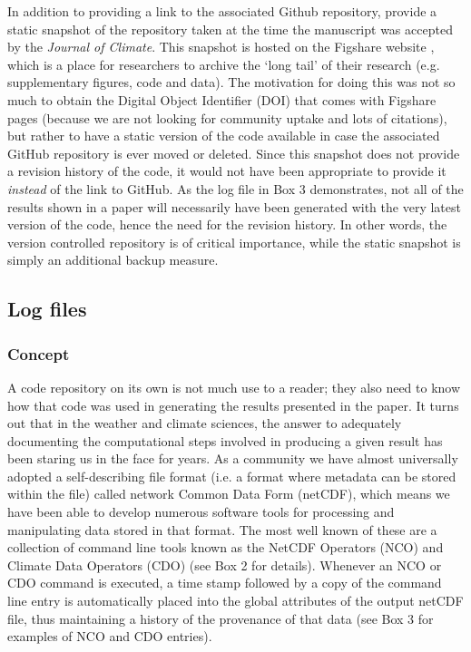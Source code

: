 In addition to providing a link to the associated Github repository, \citet{Irving2015} provide a static snapshot of the repository taken at the time the manuscript was accepted by the \textit{Journal of Climate}. This snapshot is hosted on the Figshare website \citep{Irving2015a}, which is a place for researchers to archive the `long tail' of their research (e.g. supplementary figures, code and data). The motivation for doing this was not so much to obtain the Digital Object Identifier (DOI) that comes with Figshare pages (because we are not looking for community uptake and lots of citations), but rather to have a static version of the code available in case the associated GitHub repository is ever moved or deleted. Since this snapshot does not provide a revision history of the code, it would not have been appropriate to provide it \textit{instead} of the link to GitHub. As the log file in Box 3 demonstrates, not all of the results shown in a paper will necessarily have been generated with the very latest version of the code, hence the need for the revision history. In other words, the version controlled repository is of critical importance, while the static snapshot is simply an additional backup measure.  

\subsection{Log files}\label{s:log_files}

\subsubsection{Concept}
A code repository on its own is not much use to a reader; they also need to know how that code was used in generating the results presented in the paper. It turns out that in the weather and climate sciences, the answer to adequately documenting the computational steps involved in producing a given result has been staring us in the face for years. As a community we have almost universally adopted a self-describing file format (i.e. a format where metadata can be stored within the file) called network Common Data Form (netCDF), which means we have been able to develop numerous software tools for processing and manipulating data stored in that format. The most well known of these are a collection of command line tools known as the NetCDF Operators (NCO) and Climate Data Operators (CDO) (see Box 2 for details). Whenever an NCO or CDO command is executed, a time stamp followed by a copy of the command line entry is automatically placed into the global attributes of the output netCDF file, thus maintaining a history of the provenance of that data (see Box 3 for examples of NCO and CDO entries).

